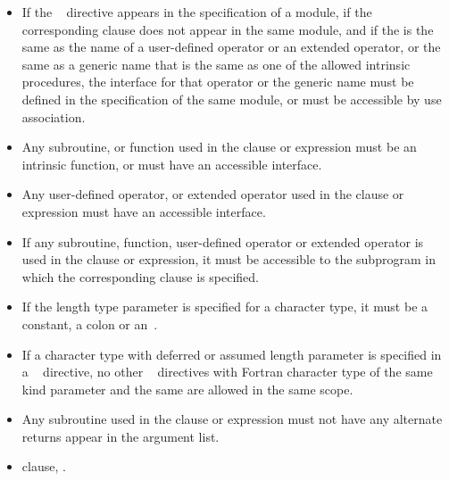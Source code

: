 \begin{itemize}
\item If the ~ directive appears in the specification of a module, if the corresponding  clause does not appear in the same module, and if the  is the same as the name of a user-defined operator or an extended operator, or the same as a generic name that is the same as one of the allowed intrinsic procedures, the interface for that operator or the generic name must be defined in the specification of the same module, or must be accessible by use association. 

\item Any subroutine, or function used in the  clause or  expression must be an intrinsic function, or must have an accessible interface. 

\item Any user-defined operator, or extended operator used in the  clause or  expression must have an accessible interface. 

\item If any subroutine, function, user-defined operator or extended operator is used in the  clause or  expression, it must be accessible to the subprogram in which the corresponding  clause is specified. 

\item If the length type parameter is specified for a character type, it must be a constant, a colon or an~\code{*}. 

\item If a character type with deferred or assumed length parameter is specified in a ~ directive, no other ~ directives with Fortran character type of the same kind parameter and the same  are allowed in the same scope.

\item Any subroutine used in the  clause or  expression must not have any alternate returns appear in the argument list.
\fortranspecificend
\end{itemize}

\crossreferences
\begin{itemize}
\item {} clause, 
.
\end{itemize}










